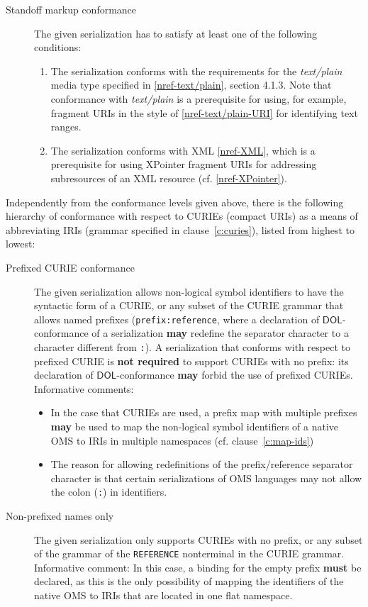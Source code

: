 \documentclass[10pt, a4paper]{isov2}
\makeatletter
\newcommand*{\cf}{cf.\@\xspace}
\newcommand*\CommentAuthor{}
\renewcommand*\CommentAuthor{#1}}
\newcommand*\CommentDate{}
\renewcommand*\CommentDate{#1}}
\newcommand*\CommentId{}
\renewcommand*\CommentId{#1}}
\newcommand*\CommentType{}
\renewcommand*\CommentType{#1}}
\newcommand*{\SetCommentColorByType}[1]{%
\edef\localType{{#1}}%
\expandafter\ifstrequal\localType{q-aut}{\colorlet{CommentColor}{red}}{%
\expandafter\ifstrequal\localType{q-all}{\colorlet{CommentColor}{orange}}{%
\expandafter\ifstrequal\localType{todo}{\colorlet{CommentColor}{orange}}{%
\expandafter\ifstrequal\localType{fyi}{\colorlet{CommentColor}{lightgray}}{%
\colorlet{CommentColor}{yellow}}}}}}
\newcommand*{\SetCommentPrefixByType}[1]{%
\edef\localType{{#1}}%
\expandafter\@ifmtarg\localType{%
\edef\CommentPrefix{}%
}{%
\caseupper[q]{#1}%
\edef\CommentPrefix{\thestring: }%
}}
\newcommand*{\initComment}[1]{%
\setkeys{Comment}{#1}%
\SetCommentColorByType{\CommentType}%
\relax%
\SetCommentPrefixByType{\CommentType}%
\relax%
}
\newcommand*{\todonote}[2][]{%
\initComment{#1}%
\pdfcomment[author=\CommentAuthor,color=CommentColor,date=\CommentDate,id=\CommentId]{%
\CommentPrefix
#2}}
\renewcommand*{\todonote}[2][]{%
\initComment{#1}%
\ednote{\CommentPrefix #2}}
\newcommand*{\mimetype}[1]{\textit{#1}}
\newcommand*{\syntax}[1]{\texttt{#1}}
\newcommand*{\notrequired}{\textbf{not required}\xspace}
\newcommand*{\may}{\textbf{may}\xspace}
\newcommand*{\hasto}{\textbf{must}\xspace}
\newcommand*{\DOL}{\ensuremath{\mathsf{DOL}}\xspace}
\renewcommand{\clauserefname}{clause}
\renewcommand{\noterefname}{note}
\renewcommand{\cref}[1]{\clauserefname~\ref{#1}}
\renewcommand{\nref}[1]{\noterefname~\ref{#1}}
\renewcommand{\nref}[1]{\ref{nref-#1}}
\makeatother
\begin{document}
\begin{description}
\item[Standoff markup conformance]
The given serialization has to satisfy at least one of the following conditions:
\begin{enumerate}
\item\label{it:standoff-text-plain} The serialization conforms with the requirements for the \mimetype{text/plain} media type specified in \nref{text/plain}, section 4.1.3.
Note that conformance with \mimetype{text/plain} is a prerequisite for using, for
example, fragment URIs in the style of \nref{text/plain-URI} for identifying text ranges.
\item\label{it:standoff-xpointer} The serialization conforms with XML \nref{XML}, which is a prerequisite for using XPointer fragment URIs for addressing subresources of an XML resource (cf. \nref{XPointer}).
\end{enumerate}
\end{description}


Independently from the conformance levels given above, there is the following hierarchy of conformance with respect to CURIEs (compact URIs) as a means of abbreviating IRIs (grammar specified in \cref{c:curies}), listed from highest to lowest:
\begin{description}
\item[Prefixed CURIE conformance] The given serialization allows non-logical symbol identifiers to have the syntactic form of a CURIE, or any subset of the CURIE grammar that allows named prefixes (\syntax{prefix:reference}, where a declaration of \DOL-conformance of a serialization \may redefine the separator character to a character different from \syntax{:}).
A serialization that conforms with respect to prefixed CURIE  is \notrequired to support CURIEs with no prefix: its declaration of \DOL-conformance \may forbid the use of prefixed CURIEs.\\
  Informative comments:
  \begin{itemize}
  \item In the case that CURIEs are used, a prefix map with multiple prefixes \may be used to map the non-logical symbol identifiers of a native OMS to IRIs in multiple namespaces (\cf \cref{c:map-ids})
  \item The reason for allowing redefinitions of the prefix/reference separator character is that certain serializations of OMS languages may not allow the colon (\syntax{:}) in identifiers.
  \end{itemize}
\item[Non-prefixed names only] The given serialization only supports CURIEs with no prefix, or any subset of the grammar of the \syntax{REFERENCE} nonterminal in the CURIE grammar.\\
  Informative comment: In this case, a binding for the empty prefix \hasto be declared, as this is the only possibility of mapping the identifiers of the native OMS to IRIs that are located in one flat namespace.
\end{description}
\end{document}
